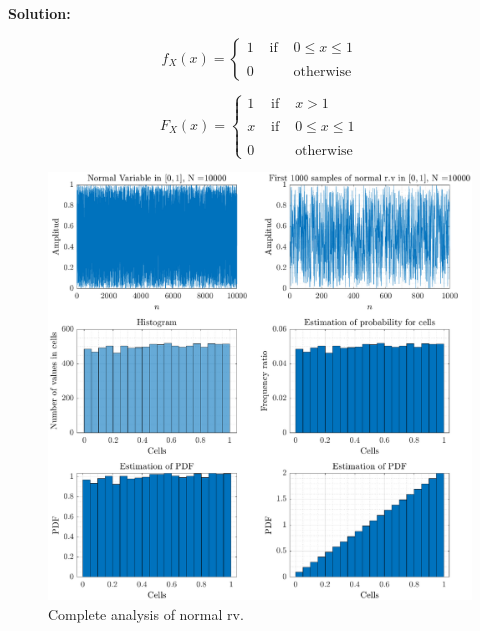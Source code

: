\documentclass[10pt,a4paper]{article}
\begin{document}
\begin{enumerate}
	
	\textbf{Solution:}
	
	
	
	
	\begin{tcolorbox}
	\begin{equation}
		f_{X}(x)= \left\{ \begin{array}{lcl}
				1 & \mbox{ if } & 0 \leq x  \leq 1\\
				& & \\
				0 & \mbox{  } & \text{otherwise}
			\end{array}
		\right.
	\end{equation}
	\end{tcolorbox}
	
	 
	 \begin{tcolorbox}
	\begin{equation}
		F_{X}(x)= \left\{ \begin{array}{lcl}
				1 & \mbox{ if } &  x  > 1\\
				& & \\
				x & \mbox{ if } & 0 \leq x  \leq 1\\
				& & \\
				0 & \mbox{  } & \text{otherwise}
			\end{array}
		\right.
	\end{equation}
	\end{tcolorbox}	
	
	
	
	\begin{figure}[h!]
		\centering
		\includegraphics[width=15cm]{ej3.eps}
		\caption{Complete analysis of normal rv.}
	\end{figure}
	
	
	
\end{enumerate}
\end{document}
